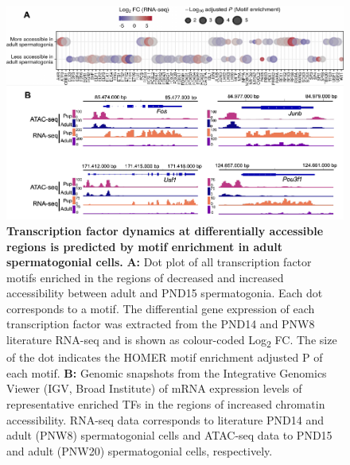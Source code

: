 \documentclass[12pt,twoside]{reedthesis}
\begin{document}
\begin{subfigures}

\begin{figure}[htbp]

{\centering \includegraphics{thesis_files/figure-latex/df4a-1} 

}

\caption[Transcription factor dynamics at differentially accessible regions is predicted by motif enrichment in adult spermatogonial cells]{\textbf{Transcription factor dynamics at differentially accessible regions is predicted by motif enrichment in adult spermatogonial cells.} \newline \textbf{A:} Dot plot of all transcription factor motifs enriched in the regions of decreased and increased accessibility between adult and PND15 spermatogonia. Each dot corresponds to a motif. The differential gene expression of each transcription factor was extracted from the PND14 and PNW8 literature RNA-seq and is shown as colour-coded Log\textsubscript{2} FC. The size of the dot indicates the HOMER motif enrichment adjusted P of each motif. \newline \textbf{B:} Genomic snapshots from the Integrative Genomics Viewer (IGV, Broad Institute) of mRNA expression levels of representative enriched TFs in the regions of increased chromatin accessibility. RNA-seq data corresponds to literature PND14 and adult (PNW8) spermatogonial cells and  ATAC-seq data to PND15 and adult (PNW20) spermatogonial cells, respectively.}\label{fig:df4a}
\end{figure}

\begin{figure}[htbp]


\end{figure}
\end{subfigures}
\end{document}
